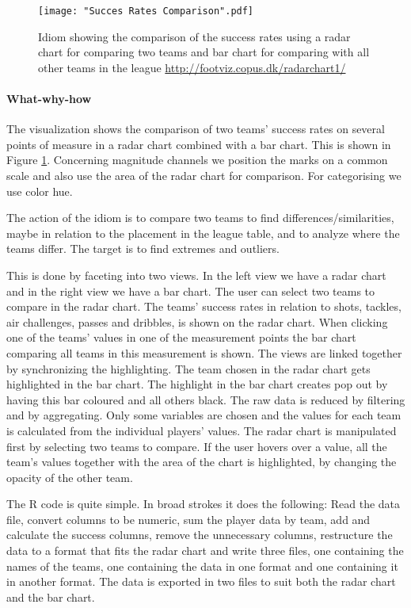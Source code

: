 \documentclass[Report.tex]{subfiles}
\begin{document}
\begin{figure}
\center
\texttt{[image: "Succes Rates Comparison".pdf]}
\caption{Idiom showing the comparison of the success rates using a radar chart for comparing two teams and bar chart for comparing with all other teams in the league \url{http://footviz.copus.dk/radarchart1/}}
\label{Fig:SuccesRates}
\end{figure}

\paragraph{What-why-how\\}
The visualization shows the comparison of two teams' success rates on several points of measure in a radar chart combined with a bar chart. This is shown in Figure \ref{Fig:SuccesRates}. Concerning magnitude channels we position the marks on a common scale and also use the area of the radar chart for comparison. For categorising we use color hue.

The action of the idiom is to compare two teams to find differences/similarities, maybe in relation to the placement in the league table, and to analyze where the teams differ. The target is to find extremes and outliers.

This is done by faceting into two views. In the left view we have a radar chart and in the right view we have a bar chart. The user can select two teams to compare in the radar chart. The teams' success rates in relation to shots, tackles, air challenges, passes and dribbles, is shown on the radar chart. When clicking one of the teams' values in one of the measurement points the bar chart comparing all teams in this measurement is shown. The views are linked together by synchronizing the highlighting. The team chosen in the radar chart gets highlighted in the bar chart. The highlight in the bar chart creates pop out by having this bar coloured and all others black.
The raw data is reduced by filtering and by aggregating. Only some variables are chosen and the values for each team is calculated from the individual players' values. 
The radar chart is manipulated first by selecting two teams to compare. If the user hovers over a value, all the team's values together with the area of the chart is highlighted, by changing the opacity of the other team.

The R code is quite simple. In broad strokes it does the following: Read the data file, convert columns to be numeric, sum the player data by team, add and calculate the success columns, remove the unnecessary columns, restructure the data to a format that fits the radar chart and write three files, one containing the names of the teams, one containing the data in one format and one containing it in another format. The data is exported in two files to suit both the radar chart and the bar chart.
\end{document}
